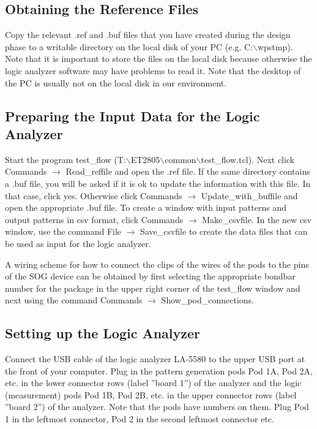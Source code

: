 \subsection{Obtaining the Reference Files}
Copy the relevant .ref and .buf files
that you have created during the design phase to
a writable directory on the local disk of your PC 
(e.g. C:$\backslash$wpstmp).
Note that it is important to store the files on the local disk
because otherwise the logic analyzer software may have problems to read it.
Note that the desktop of the PC is usually not on the local disk in our environment.

\subsection{Preparing the Input Data for the Logic Analyzer}
Start the program test\_flow (T:$\backslash$ET2805$\backslash$common$\backslash$test\_flow.tcl).
Next click Commands $\rightarrow$ Read\_reffile and open the .ref 
file.  If the same directory contains a .buf file, you will be asked if it is ok to update the 
information with this file. In that case, click yes. Otherwise click Commands $\rightarrow$ 
Update\_with\_buffile and open the appropriate .buf file. To create a window with input 
patterns and output patterns in csv format, click Commands $\rightarrow$ Make\_csvfile.
In the new csv window, use the command File $\rightarrow$ Save\_csvfile to create the 
data files that can be used as input for the logic analyzer.

A wiring scheme for how to connect the clips of the wires of the pods to the pins of the 
SOG device can be obtained by first selecting the appropriate bondbar number for the 
package in the upper right corner of the test\_flow window and next using the command 
Commands $\rightarrow$ Show\_pod\_connections. 

\subsection{Setting up the Logic Analyzer}
Connect the USB cable of the logic analyzer LA-5580 to the upper USB port at
the front of your computer.  
Plug in the pattern generation pods Pod 1A, Pod 2A, etc. in the lower connector rows 
(label ''board 1'') of the analyzer and the logic (measurement) pods Pod 1B, Pod 2B, 
etc. in the upper connector rows (label ''board 2'') of the analyzer.  
Note that the pods 
have numbers on them. Plug Pod 1 in the leftmost connector, Pod 2 in the second 
leftmost connector etc.

